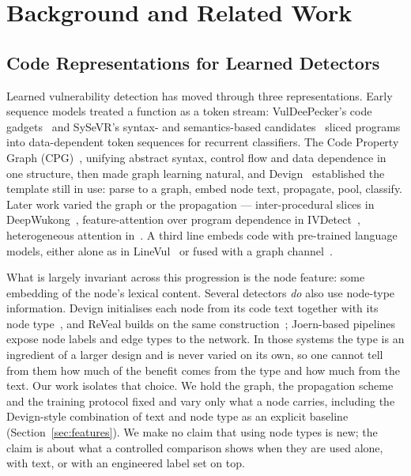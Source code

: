\section{Background and Related Work}
\label{sec:background}

\subsection{Code Representations for Learned Detectors}
Learned vulnerability detection has moved through three representations. Early
sequence models treated a function as a token stream: VulDeePecker's code
gadgets~\cite{li2018vuldeepecker} and SySeVR's syntax- and semantics-based
candidates~\cite{li2022sysevr} sliced programs into data-dependent token
sequences for recurrent classifiers. The Code Property Graph
(CPG)~\cite{yamaguchi2014modeling}, unifying abstract syntax, control flow and
data dependence in one structure, then made graph learning natural, and
Devign~\cite{zhou2019devign} established the template still in use: parse to a
graph, embed node text, propagate, pool, classify. Later work varied the
graph or the propagation --- inter-procedural slices in
DeepWukong~\cite{cheng2021deepwukong}, feature-attention over program
dependence in IVDetect~\cite{li2021ivdetect}, heterogeneous attention
in~\cite{luo2025hagnn}. A third line embeds code with pre-trained language
models, either alone as in LineVul~\cite{fu2022linevul} or fused with a graph
channel~\cite{hin2022linevd, sun2024vullmgnns}.

What is largely invariant across this progression is the node feature: some
embedding of the node's lexical content. Several detectors \emph{do} also use
node-type information. Devign initialises each node from its code text together
with its node type~\cite{zhou2019devign}, and ReVeal builds on the same
construction~\cite{chakraborty2022deep}; Joern-based pipelines expose node
labels and edge types to the network. In those systems the type is an
ingredient of a larger design and is never varied on its own, so one cannot
tell from them how much of the benefit comes from the type and how much from
the text. Our work isolates that choice. We hold the graph, the propagation
scheme and the training protocol fixed and vary only what a node carries,
including the Devign-style combination of text and node type as an explicit
baseline (Section~\ref{sec:features}). We make no claim that using node types
is new; the claim is about what a controlled comparison shows when they are
used alone, with text, or with an engineered label set on top.

